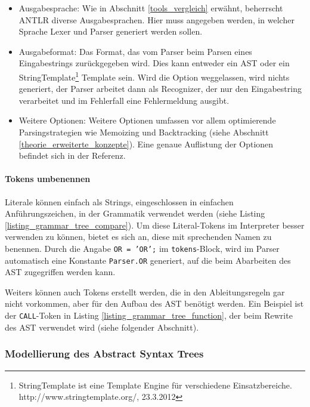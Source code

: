 \begin{itemize}
  \item Ausgabesprache: Wie in Abschnitt \ref{tools_vergleich} erwähnt, beherrscht ANTLR diverse Ausgabesprachen. Hier muss angegeben werden, in welcher Sprache Lexer und Parser generiert werden sollen.

  \item Ausgabeformat: Das Format, das vom Parser beim Parsen eines Eingabestrings zurückgegeben wird. Dies kann entweder ein AST oder ein StringTemplate\footnote{StringTemplate ist eine Template Engine für verschiedene Einsatzbereiche. http://www.stringtemplate.org/, 23.3.2012} Template sein. Wird die Option weggelassen, wird nichts generiert, der Parser arbeitet dann als Recognizer, der nur den Eingabestring verarbeitet und im Fehlerfall eine Fehlermeldung ausgibt.

  \item Weitere Optionen: Weitere Optionen umfassen vor allem optimierende Parsingstrategien wie Memoizing und Backtracking (siehe Abschnitt \ref{theorie_erweiterte_konzepte}). Eine genaue Auflistung der Optionen befindet sich in der Re\-fe\-renz\cite{Parr07}.
\end{itemize}



\paragraph{Tokens umbenennen}

Literale können einfach als Strings, eingeschlossen in einfachen Anführungszeichen, in der Grammatik verwendet werden (siehe Listing \ref{listing_grammar_tree_compare}). Um diese Literal-Tokens im Interpreter besser verwenden zu können, bietet es sich an, diese mit sprechenden Namen zu benennen. Durch die Angabe \texttt{OR = 'OR';} im \texttt{tokens}-Block, wird im Parser automatisch eine Konstante \texttt{Parser.OR} generiert, auf die beim Abarbeiten des AST zugegriffen werden kann.

Weiters können auch Tokens erstellt werden, die in den Ab\-lei\-tungs\-re\-geln gar nicht vorkommen, aber für den Aufbau des AST benötigt werden. Ein Beispiel ist der \texttt{CALL}-Token in Listing \ref{listing_grammar_tree_function}, der beim Rewrite des AST verwendet wird (siehe folgender Abschnitt).

\subsubsection{Modellierung des Abstract Syntax Trees}

